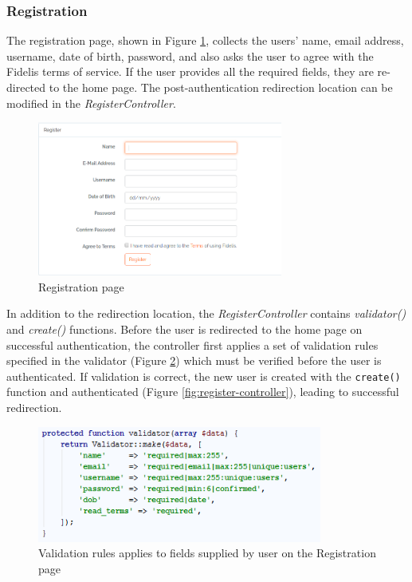 \subsubsection{Registration}
The registration page, shown in Figure \ref{fig:RegisterPage}, collects the users' name, email address, username, date of birth, password, and also asks the user to agree with the Fidelis terms of service. If the user provides all the required fields, they are re-directed to the home page. The post-authentication redirection location can be modified in the \textit{RegisterController}.

\begin{figure}[H]
\centering
\includegraphics[height=2in]{Images/Design/register-page}
\caption{Registration page}
\label{fig:RegisterPage}
\end{figure}

In addition to the redirection location, the \textit{RegisterController} contains \textit{validator()} and \textit{create()} functions. Before the user is redirected to the home page on successful authentication, the controller first applies a set of validation rules specified in the validator (Figure \ref{fig:RegValidation}) which must be verified before the user is authenticated. If validation is correct, the new user is created with the \texttt{create()} function and authenticated (Figure \ref{fig:register-controller}), leading to successful redirection.

\begin{figure}[H]
\centering
\includegraphics[height=1.5in]{Images/Implementation/RegisterValidation}
\caption{Validation rules applies to fields supplied by user on the Registration page}
\label{fig:RegValidation}
\end{figure}

